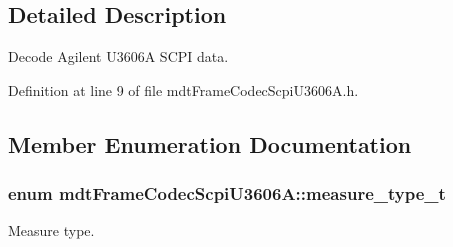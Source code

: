 \subsection{Detailed Description}
Decode Agilent U3606A SCPI data. 

Definition at line 9 of file mdtFrameCodecScpiU3606A.h.



\subsection{Member Enumeration Documentation}
\hypertarget{classmdt_frame_codec_scpi_u3606_a_a3d7a1de14d77797a08e3d2991fa9f004}{
\subsubsection[{measure\_\-type\_\-t}]{\setlength{\rightskip}{0pt plus 5cm}enum {\bf mdtFrameCodecScpiU3606A::measure\_\-type\_\-t}}}
\label{classmdt_frame_codec_scpi_u3606_a_a3d7a1de14d77797a08e3d2991fa9f004}


Measure type. 

